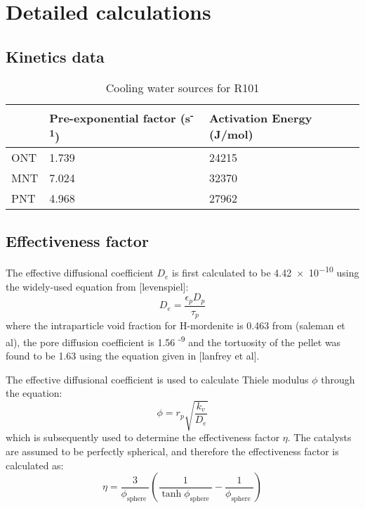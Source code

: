 \section{Detailed calculations}
\label{app:reaction}
\subsection{Kinetics data}

\begin{table}[]
\centering
\caption{Cooling water sources for R101}
\label{tab:cwtable}
\begin{tabular}{lll}
\hline
 & Pre-exponential factor (s\textsuperscript{-1}) & Activation Energy (J/mol) \\ \hline
ONT & 1.739 & 24215 \\
MNT & 7.024 & 32370 \\
PNT & 4.968 & 27962 \\ \hline
\end{tabular}
\end{table}

\subsection{Effectiveness factor}

The effective diffusional coefficient $D_e$ is first calculated to be \num{4.42e-10} using the widely-used equation from [levenspiel]: 
\begin{equation}
    D_e = \frac{\epsilon_p D_p}{\tau_p}
\end{equation}
where the intraparticle void fraction for H-mordenite is 0.463 from (saleman et al), the pore diffusion coefficient is 1.56 \textsuperscript{-9} and the tortuosity of the pellet was found to be 1.63 using the equation given in [lanfrey et al]. 

The effective diffusional coefficient is used to calculate Thiele modulus $\phi$ through the equation:
\begin{equation}
    \phi = r_p \sqrt{\frac{k_v}{D_e}}
\end{equation}
which is subsequently used to determine the effectiveness factor $\eta$. The catalysts are assumed to be perfectly spherical, and therefore the effectiveness factor is calculated as: 
\begin{equation}
\eta=\frac{3}{\phi_{\text {sphere }}}\left(\frac{1}{\tanh \phi_{\text {sphere }}}-\frac{1}{\phi_{\text {sphere }}}\right)
\end{equation}

